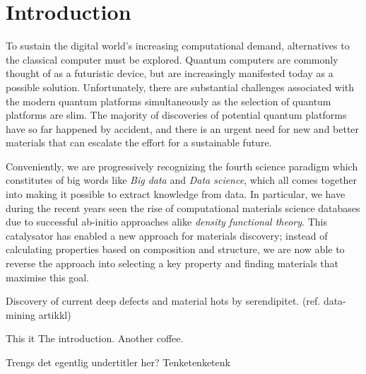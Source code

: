 \chapter{Introduction}

To sustain the digital world's increasing computational demand, alternatives to the classical computer must be explored. Quantum computers are commonly thought of as a futuristic device, but are increasingly manifested today as a possible solution. Unfortunately, there are substantial challenges associated with the modern quantum platforms simultaneously as the selection of quantum platforms are slim. The majority of discoveries of potential quantum platforms have so far happened by accident, and there is an urgent need for new and better materials that can escalate the effort for a sustainable future.

Conveniently, we are progressively recognizing the fourth science paradigm which constitutes of big words like \textit{Big data} and \textit{Data science}, which all comes together into making it possible to extract knowledge from data. In particular, we have during the recent years seen the rise of computational materials science databases due to successful ab-initio approaches alike \textit{density functional theory}. This catalysator has enabled a new approach for materials discovery; instead of calculating properties based on composition and structure, we are now able to reverse the approach into selecting a key property and finding materials that maximise this goal.



Discovery of current deep defects and material hots by serendipitet. (ref. data-mining artikkl)

This it The introduction.
Another coffee.

Trengs det egentlig undertitler her? Tenketenketenk



